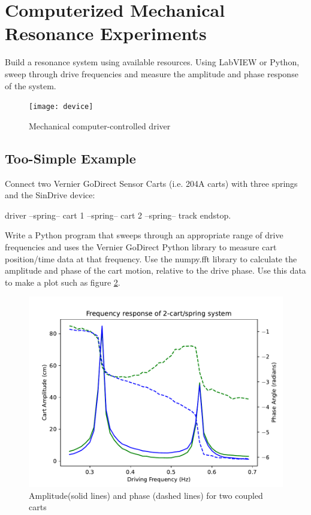 \documentclass[11 pt]{article}
\begin{document}
\section*{Computerized Mechanical Resonance Experiments}

Build a resonance system using available resources.
Using LabVIEW or Python, sweep through drive frequencies and measure the amplitude and phase response of the system.

\begin{figure}[h]
	\begin{center}
		\texttt{[image: device]}
	\end{center}
	\caption{Mechanical computer-controlled driver}
	\label{fig:driver}
\end{figure}

\subsection*{Too-Simple Example}

Connect two Vernier GoDirect Sensor Carts (i.e. 204A carts) with three springs and the SinDrive device:

driver --spring-- cart 1 --spring-- cart 2 --spring-- track endstop.

Write a Python program that sweeps through an appropriate range of drive frequencies and uses the Vernier GoDirect Python library to measure cart position/time data at that frequency. 
Use the numpy.fft library to calculate the amplitude and phase of the cart motion, relative to the drive phase.
Use this data to make a plot such as figure \ref{fig:2-carts}.

\begin{figure}[h]
	\begin{center}
		\includegraphics[width=5in]{2-cart_response}
	\end{center}
	\caption{Amplitude(solid lines) and phase (dashed lines) for two coupled carts}
	\label{fig:2-carts}
\end{figure}
\end{document}
